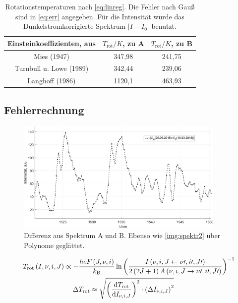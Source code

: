 \documentclass[numbers=noenddot,a4paper,notitlepage,twoside,BCOR15mm]{scrartcl}
\newcommand{\diff}{\textnormal{d}}
\newcommand{\ix}[1]{_\text{#1}}
\begin{document}
			\begin{table}
				\centering
				\begin{tabular}{c|c|c}
					Einsteinkoeffizienten, aus \cite{EMAUGreifswaldOHRot} & $T\ix{rot}/\unit{K}$, zu A & $T\ix{rot}/\unit{K}$, zu B\\
					\hline Mies (1947) & 347,98 & 241,75 \\
					\hline Turnbull u. Lowe (1989) & 342,44 & 239,06 \\
					\hline Langhoff (1986) & 1120,1 & 463,93
				\end{tabular}
				\caption{Rotationstemperaturen nach \autoref{eq:linreg}. Die Fehler nach Gauß sind in \autoref{eq:err} angegeben. Für die Intensität wurde das Dunkelstromkorrigierte Spektrum $|I-I\ix{0}|$ benutzt.}
				\label{tab:trot}
			\end{table}

		\subsection{Fehlerrechnung}

			\begin{figure}
				\centering
				\includegraphics[width=0.9\textwidth]{differenz.png}
				\caption{Differenz aus Spektrum A und B. Ebenso wie \autoref{img:spektr2} über Polynome geglättet.}
				\label{img:diff}
			\end{figure}

			\begin{align}
				T\ix{rot}\left(I,\nu,i,J\right)\propto-&\frac{hcF\left(J,\nu,i\right)}{k\ix{B}}\ln\left(\frac{I\left(\nu,i,J\leftarrow\nu\prime,i\prime,J\prime\right)}{2\left(2J+1\right)A\left(\nu,i,J\rightarrow\nu\prime,i\prime,J\prime\right)}\right)^{-1} \\
				\Delta& T\ix{rot}\approx\sqrt{\left(\frac{\diff T\ix{rot}}{\diff I_{\nu,i,J}}\right)^2\cdot\left(\Delta I_{\nu,i,J}\right)^2} \label{eq:gauss}
			\end{align}
\end{document}
